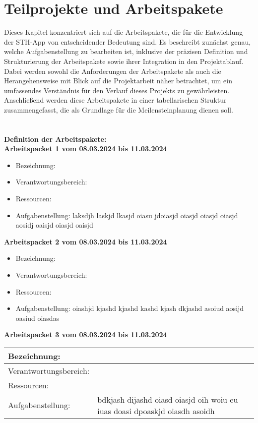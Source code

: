 \chapter{Teilprojekte und Arbeitspakete}
Dieses Kapitel konzentriert sich auf die Arbeitspakete, die für die Entwicklung der STH-App von entscheidender Bedeutung sind.
Es beschreibt zunächst genau, welche Aufgabenstellung zu bearbeiten ist, inklusive der präzisen Definition und Strukturierung der Arbeitspakete sowie ihrer Integration in den Projektablauf. 
Dabei werden sowohl die Anforderungen der Arbeitspakete als auch die Herangehensweise mit Blick auf die Projektarbeit näher betrachtet, um ein umfassendes Verständnis für den Verlauf dieses Projekts zu gewährleisten.
Anschließend werden diese Arbeitspakete in einer tabellarischen Struktur zusammengefasst, die als Grundlage für die Meilensteinplanung dienen soll.
\\
\\
\\
\textbf{Definition der Arbeitspakete:} \\

\textbf{Arbeitspacket 1 vom 08.03.2024 bis 11.03.2024}
\begin{itemize}[itemsep=0pt]
	\item{Bezeichnung: }
	\item{Verantwortungsbereich: } 
	\item{Ressourcen: } 
    \item{Aufgabenstellung: laksdjh laskjd lkasjd oiasu jdoiasjd oiasjd oiasjd oiasjd aosidj oaisjd oiasjd oaisjd}
\end{itemize} 

\textbf{Arbeitspacket 2 vom 08.03.2024 bis 11.03.2024}
\begin{itemize}[itemsep=0pt]
	\item{Bezeichnung: }
	\item{Verantwortungsbereich: } 
	\item{Ressourcen: } 
    \item{Aufgabenstellung: oiashjd kjashd kjashd kashd kjash dkjashd asoiud aosijd oasiud oiasdas}
\end{itemize}

\textbf{Arbeitspacket 3 vom 08.03.2024 bis 11.03.2024}
\\
\hspace*{0,25cm}
\begin{tabular}{|l|p{8cm}|}
	\hline
	{Bezeichnung:} & \\
	\hline
	{Verantwortungsbereich:} & \\
	\hline
	{Ressourcen:} & \\
	\hline
	{Aufgabenstellung:} & {bdkjash dijashd oiasd oiasjd oih woiu eu iuas doasi dpoaskjd oiasdh asoidh }\\
	\hline
\end{tabular}

